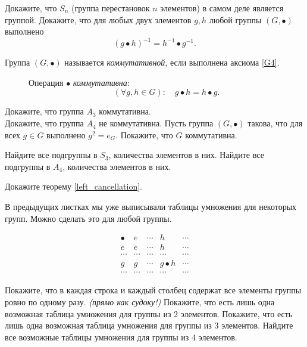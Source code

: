 \documentclass[a4paper,12pt]{article}
\begin{document}
    \problem Докажите, что $S_n$ (группа перестановок $n$ элементов) в самом деле является группой.
    \problem Докажите, что для любых двух элементов $g, h$ любой группы $(G, \bullet)$ выполнено
    \begin{equation*}
        (g \bullet h)^{-1} = h^{-1} \bullet g^{-1}.
    \end{equation*}
    
     Группа $(G, \bullet)$ называется \emph{коммутативной}, если выполнена аксиома \ref{G4}.
    \begin{description}
        \item[] Операция $\bullet$ \emph{коммутативна}:
        \begin{equation*}
            (\forall g, h \in G): \quad g \bullet h = h \bullet g.
        \end{equation*}
    \end{description}
    \problem \sub Докажите, что группа $A_3$ коммутативна. \\
    \sub Докажите, что группа $A_4$ не коммутативна.
     Пусть группа $(G, \bullet)$ такова, что для всех $g \in G$ выполнено $g^2 = e_G$. Покажите, что $G$ коммутативна.
    
    \problem \sub Найдите все подгруппы в $S_3$, количества элементов в них.
    \sub Найдите все подгруппы в $A_4$, количества элементов в них.
    
    \problem Докажите теорему \ref{left_cancellation}. \par
    В предыдущих листках мы уже выписывали таблицы умножения для некоторых групп. Можно сделать это для любой группы.
    \begin{center}
        \begin{equation*}
            \begin{array}{c||c|c|c|c}
                \bullet & e & \cdots & h & \cdots \\ \hline \hline
                e & e & \cdots & h & \cdots \\ \hline
                \cdots & \cdots & \cdots & \cdots & \cdots \\ \hline
                g & g & \cdots & g \bullet h & \cdots \\ \hline
                \cdots & \cdots & \cdots & \cdots & \cdots
            \end{array}
        \end{equation*}
    \end{center}
    \problem Покажите, что в каждая строка и каждый столбец содержат все элементы группы ровно по одному разу. \textit{(прямо как судоку!)}
    \problem \sub Покажите, что есть лишь одна возможная таблица умножения для группы из 2 элементов.
     Покажите, что есть лишь одна возможная таблица умножения для группы из 3 элементов. 
     Найдите все возможные таблицы умножения для группы из 4 элементов. 
\end{document}
